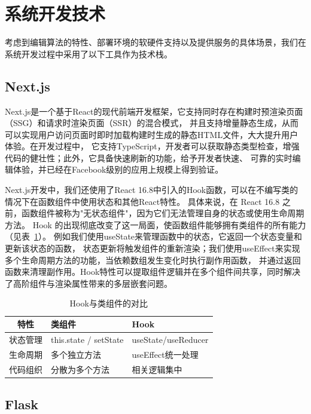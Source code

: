 \section{系统开发技术}

考虑到编辑算法的特性、部署环境的软硬件支持以及提供服务的具体场景，我们在系统开发过程中采用了以下工具作为技术栈。

\subsection{Next.js}

Next.js是一个基于React的现代前端开发框架\cite{lazuardy2022modern}，它支持同时存在构建时预渲染页面（SSG）和请求时渲染页面（SSR）的混合模式，
并且支持增量静态生成，从而可以实现用户访问页面时即时加载构建时生成的静态HTML文件，大大提升用户体验。在开发过程中，
它支持TypeScript，开发者可以获取静态类型检查，增强代码的健壮性；此外，它具备快速刷新的功能，给予开发者快速、
可靠的实时编辑体验，并已经在Facebook级别的应用上规模上得到验证。

Next.js开发中，我们还使用了React 16.8中引入的Hook函数\cite{reacthooks2019}\cite{bugl2019learn}，可以在不编写类的情况下在函数组件中使用状态和其他React特性。
具体来说，在 React 16.8 之前，函数组件被称为"无状态组件"，因为它们无法管理自身的状态或使用生命周期方法。
Hook 的出现彻底改变了这一局面，使函数组件能够拥有类组件的所有能力（见表~\ref{tab:hooks}）。
例如我们使用useState来管理函数中的状态，它返回一个状态变量和更新该状态的函数，
状态更新将触发组件的重新渲染；我们使用useEffect来实现多个生命周期方法的功能，当依赖数组发生变化时执行副作用函数，
并通过返回函数来清理副作用。Hook特性可以提取组件逻辑并在多个组件间共享，同时解决了高阶组件与渲染属性带来的多层嵌套问题。

\begin{table}
    \centering
    \caption{Hook与类组件的对比}
    \label{tab:hooks}
    \begin{tabular}{cll}
        \toprule
        特性   & 类组件  &Hook                                  \\
        \midrule
        状态管理 & this.state / setState & useState/useReducer \\
        生命周期 & 多个独立方法 & useEffect统一处理   \\
        代码组织 & 分散为多个方法 & 相关逻辑集中  \\
        \bottomrule
    \end{tabular}
\end{table}

\subsection{Flask}

